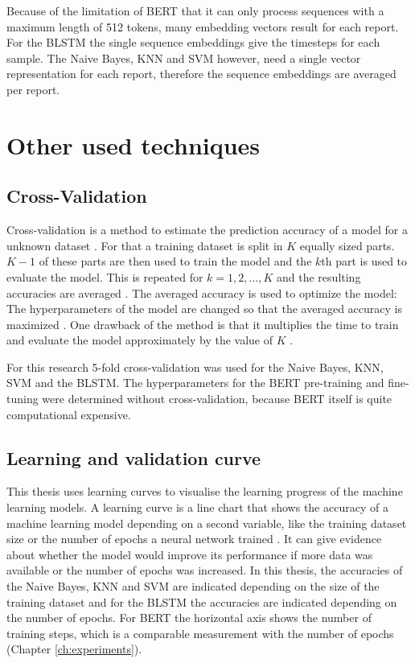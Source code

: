 Because of the limitation of \ac{BERT} that it can only process sequences with a maximum length of 512 tokens, many embedding vectors result for each report.
For the \ac{BLSTM} the single sequence embeddings give the timesteps for each sample.
The Naive Bayes, \ac{KNN} and \ac{SVM} however, need a single vector representation for each report, therefore the sequence embeddings are averaged per report.

\section{Other used techniques}
\subsection{Cross-Validation}
\label{subsec:cross_validation}
Cross-validation is a method to estimate the prediction accuracy of a model for a unknown dataset \cite[p. 241]{Hastie2009}.
For that a training dataset is split in $K$ equally sized parts.
$K-1$ of these parts are then used to train the model and the $k$th part is used to evaluate the model.
This is repeated for $k=1,2,...,K$ and the resulting accuracies are averaged \cite[p. 242]{Hastie2009}.
The averaged accuracy is used to optimize the model:
The hyperparameters of the model are changed so that the averaged accuracy is maximized \cite[p. 242]{Hastie2009}.
One drawback of the method is that it multiplies the time to train and evaluate the model approximately by the value of $K$ \cite[p. 242]{Hastie2009}.

For this research 5-fold cross-validation was used for the Naive Bayes, \ac{KNN}, \ac{SVM} and the \ac{BLSTM}.
The hyperparameters for the \ac{BERT} pre-training and fine-tuning were determined without cross-validation, because \ac{BERT} itself is quite computational expensive.

\subsection{Learning and validation curve}
This thesis uses learning curves to visualise the learning progress of the machine learning models.
A learning curve is a line chart that shows the accuracy of a machine learning model depending on a second variable, like the training dataset size or the number of epochs a neural network trained \cite[pp. 702-703]{Russel2016}.
It can give evidence about whether the model would improve its performance if more data was available or the number of epochs was increased.
In this thesis, the accuracies of the Naive Bayes, \ac{KNN} and \ac{SVM} are indicated depending on the size of the training dataset and for the \ac{BLSTM} the accuracies are indicated depending on the number of epochs.
For \ac{BERT} the horizontal axis shows the number of training steps, which is a comparable measurement with the number of epochs (Chapter \ref{ch:experiments}).


